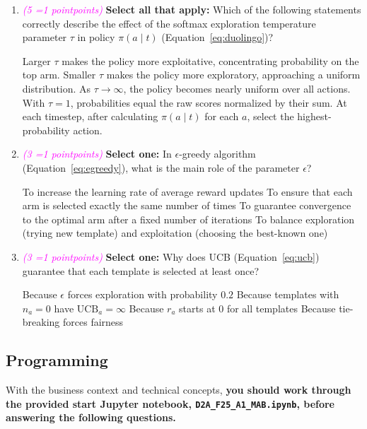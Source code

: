 \documentclass[11pt, letter, answers]{exam}
\newcommand{\grade}[1]{
    \small\textcolor{magenta}{\emph{(#1 \ifnum#1=1 point\else points\fi)}}%
    \normalsize
}
\newcommand{\sOne}{\textbf{Select one: }}
\newcommand{\sAll}{\textbf{Select all that apply: }}
\begin{document}
\begin{enumerate}[label=(\alph*)]

\item \grade{5} \sAll Which of the following statements correctly describe the effect of the softmax exploration temperature parameter $\tau$ in policy $\pi(a \mid t)$ (Equation~\ref{eq:duolingo})? 
{
\checkboxchar{$\Box$} \checkedchar{$\blacksquare$}  %
\begin{checkboxes}
    \choice Larger $\tau$ makes the policy more exploitative, concentrating probability on the top arm.
    \choice Smaller $\tau$ makes the policy more exploratory, approaching a uniform distribution.
    \choice As $\tau \to \infty$, the policy becomes nearly uniform over all actions.
    \choice With $\tau=1$, probabilities equal the raw scores normalized by their sum.
    \choice At each timestep, after calculating $\pi(a \mid t)$ for each $a$, select the highest-probability action.
\end{checkboxes}
}


\item \grade{3} \sOne In $\epsilon$-greedy algorithm (Equation~\ref{eq:egreedy}), what is the main role of the parameter $\epsilon$?
\begin{checkboxes}
    \choice To increase the learning rate of average reward updates
    \choice To ensure that each arm is selected exactly the same number of times
    \choice To guarantee convergence to the optimal arm after a fixed number of iterations
    \choice To balance exploration (trying new template) and exploitation (choosing the best-known one)
\end{checkboxes}


\item \grade{3} \sOne  Why does UCB (Equation~\ref{eq:ucb}) guarantee that each template is selected at least once?
\begin{checkboxes}
    \choice Because $\epsilon$ forces exploration with probability $0.2$
    \choice Because templates with $n_a= 0$ have $\text{UCB}_a = \infty$
    \choice Because $r_a$ starts at 0 for all templates
    \choice Because tie-breaking forces fairness
\end{checkboxes}

\end{enumerate}


\vspace{1em}
\subsection{Programming}
With the business context and technical concepts, \textbf{you should work through the provided start Jupyter notebook, \texttt{D2A\_F25\_A1\_MAB.ipynb}, before answering the following questions.}
\end{document}
